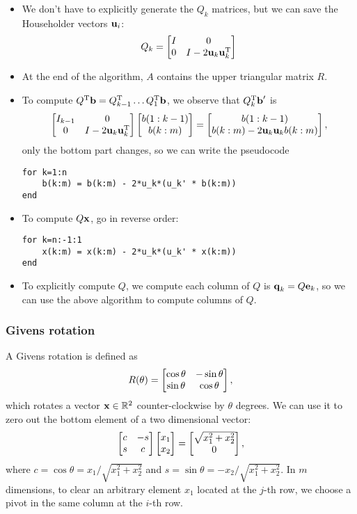 \documentclass{article}
\begin{document}
\begin{itemize}
    \item We don't have to explicitly generate the $Q_k$ matrices, but we can save the Householder vectors $\bm{\mathrm{u}}_i$:
    \begin{equation}
        Q_k=\begin{bmatrix}{I}&{0}\\{0}&{I-2\bm{\mathrm{u}}_k\bm{\mathrm{u}}_k^{\text{T}}}\end{bmatrix}
    \end{equation}
    \item At the end of the algorithm, $A$ contains the upper triangular matrix $R$.
    \item To compute $Q^{\text{T}}\bm{\mathrm{b}}=Q_{k-1}^{\text{T}}\dots Q_1^{\text{T}}\bm{\mathrm{b}}$, we observe that $Q_k^{\text{T}}\bm{\mathrm{b}}'$ is
    \begin{equation}
        \begin{bmatrix}{I_{k-1}}&{0}\\{0}&{I-2\bm{\mathrm{u}}_k\bm{\mathrm{u}}_k^{\text{T}}}\end{bmatrix}\begin{bmatrix}{b(1:k-1)}\\{b(k:m)}\end{bmatrix}=\begin{bmatrix}{b(1:k-1)}\\{b(k:m)-2\bm{\mathrm{u}}_k\bm{\mathrm{u}}_kb(k:m)}\end{bmatrix},
    \end{equation}
    only the bottom part changes, so we can write the pseudocode
    \begin{verbatim}
for k=1:n
    b(k:m) = b(k:m) - 2*u_k*(u_k' * b(k:m))
end
    \end{verbatim}
    \item To compute $Q\bm{\mathrm{x}}$, go in reverse order:
    \begin{verbatim}
for k=n:-1:1
    x(k:m) = x(k:m) - 2*u_k*(u_k' * x(k:m))
end
    \end{verbatim}
    \item To explicitly compute $Q$, we compute each column of $Q$ is $\bm{\mathrm{q}}_k=Q\bm{\mathrm{e}}_k$, so we can use the above algorithm to compute columns of $Q$.
\end{itemize}

\subsubsection{Givens rotation}
A Givens rotation is defined as 
\begin{equation}
    R(\theta)=\begin{bmatrix}{\cos\theta}&{-\sin\theta}\\{\sin\theta}&{\cos\theta}\end{bmatrix},
\end{equation}
which rotates a vector $\bm{\mathrm{x}}\in\mathbb{R}^2$ counter-clockwise by $\theta$ degrees. We can use it to zero out the bottom element of a two dimensional vector:
\begin{equation}
    \begin{bmatrix}{c}&{-s}\\{s}&{c}\end{bmatrix}\begin{bmatrix}{x_1}\\{x_2}\end{bmatrix}=\begin{bmatrix}{\sqrt{x_1^2+x_2^2}}\\{0}\end{bmatrix},
\end{equation}
where $c=\cos\theta=x_1/\sqrt{x_1^2+x_2^2}$ and $s=\sin\theta=-x_2/\sqrt{x_1^2+x_2^2}$. In $m$ dimensions, to clear an arbitrary element $x_1$ located at the $j$-th row, we choose a pivot in the same column at the $i$-th row.
\end{document}

